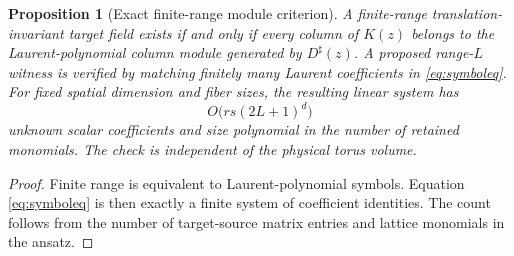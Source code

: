 \documentclass[11pt]{article}
\newtheorem{proposition}[theorem]{Proposition}
\theoremstyle{definition}
\theoremstyle{remark}
\begin{document}
\begin{proposition}[Exact finite-range module criterion]
\label{prop:module}
A finite-range translation-invariant target field exists if and only if every column of $K(z)$ belongs to the Laurent-polynomial column module generated by $D^\sharp(z)$.  A proposed range-$L$ witness is verified by matching finitely many Laurent coefficients in \eqref{eq:symboleq}.  For fixed spatial dimension and fiber sizes, the resulting linear system has
\begin{equation}
 O\bigl(r s(2L+1)^d\bigr)
 \label{eq:unknowncount}
\end{equation}
unknown scalar coefficients and size polynomial in the number of retained monomials.  The check is independent of the physical torus volume.
\end{proposition}

\begin{proof}
Finite range is equivalent to Laurent-polynomial symbols.  Equation \eqref{eq:symboleq} is then exactly a finite system of coefficient identities.  The count follows from the number of target-source matrix entries and lattice monomials in the ansatz.
\end{proof}
\end{document}
